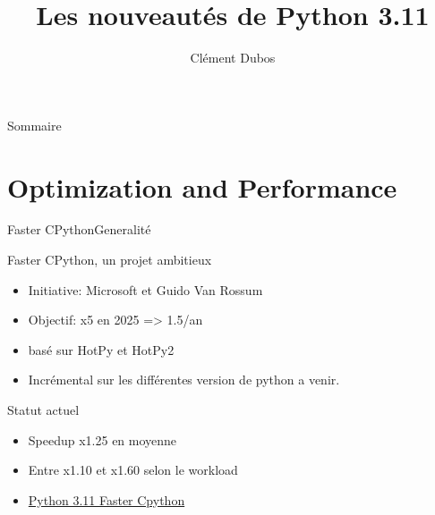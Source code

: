 \documentclass[aspectratio=169, xetex, 12pt]{beamer}
\title{Les nouveautés de Python 3.11}
\author{Clément Dubos}
\institute{Extia}
\date{\displaydate{date}}
\begin{document}
    \maketitle

    \begin{frame}{Sommaire}
        \hfill
        \parbox[t]{.9\textwidth}{
            \begin{minipage}[c][0.2\textheight]{\textwidth}
                \Large
                \tableofcontents
            \end{minipage}
        }
    \end{frame}

    \section{Optimization and Performance}

    \begin{frame}{Faster CPython}{Generalité}
        \begin{minipage}[t]{0.5\paperwidth}
            \begin{block}{Faster CPython, un projet ambitieux}
                \begin{itemize}
                    \item Initiative: Microsoft et Guido Van Rossum
                    \item Objectif: x5 en 2025 => 1.5/an
                    \item basé sur HotPy et HotPy2
                    \item Incrémental sur les différentes version de python a venir.
                \end{itemize}
            \end{block}
        \end{minipage}
        \hspace{.1cm}
        \begin{minipage}[t]{0.4\paperwidth}
            \begin{block}{Statut actuel}
                \begin{itemize}
                    \item Speedup x1.25 en moyenne
                    \item Entre x1.10 et x1.60 selon le workload
                    \item \href{https://docs.python.org/3.11/whatsnew/3.11.html\#faster-cpython}{Python 3.11 Faster Cpython}
                \end{itemize}
            \end{block}
        \end{minipage}
    \end{frame}
\end{document}
